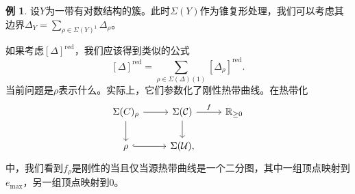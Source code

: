 \documentclass{amsart}
\theoremstyle{definition}
\newtheorem{exm}[thm]{例}
\theoremstyle{remark}
\theoremstyle{plain}
\theoremstyle{definition}
\theoremstyle{remark}
\newcommand{\R}{\mathbb{R}}
\newcommand{\mc}[1]{\mathcal{#1}}
\newcommand{\on}[1]{\operatorname{#1}}
\newcommand{\1}{\mathbf{1}}
\newcommand{\2}{\mathbf{2}}
\newcommand{\3}{\mathbf{3}}
\begin{document}
\begin{exm}
设\(Y\)为一带有对数结构的簇。此时\(\Sigma(Y)\)作为锥复形处理，我们可以考虑其边界\(\Delta_Y = \sum_{\rho \in \Sigma(Y)^1} \Delta_{\rho}\)。
\end{exm}

如果考虑\([\Delta]^{\on{red}}\)，我们应该得到类似的公式
\[ [\Delta]^{\on{red}} = \sum_{\rho \in \Sigma(\Delta)(1)} [\Delta_{\rho}]^{\on{red}}. \]
当前问题是\(\rho\)表示什么。实际上，它们参数化了刚性热带曲线。在热带化
\begin{equation*}
\begin{tikzcd}
    \Sigma(C)_{\rho} \ar{d} \ar{r} & \Sigma(\mc{C}) \ar{r}{f} \ar{d} & \R_{\geq 0} \\
    \rho \ar[hookrightarrow]{r} & \Sigma(\mc{U}),
\end{tikzcd}
\end{equation*}
中，我们看到\(f_{\rho}\)是刚性的当且仅当源热带曲线是一个二分图，其中一组顶点映射到\(e_{\max}\)，另一组顶点映射到\(0\)。
\end{document}
